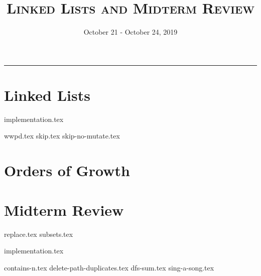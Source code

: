 \documentclass{exam}
\title{\textsc{Linked Lists and Midterm Review}}
\date{October 21 - October 24, 2019}
\begin{document}
\maketitle
\rule{\textwidth}{0.15em}
\fontsize{12}{15}\selectfont

\section{Linked Lists}
{implementation.tex}
\newpage
\begin{questions}
{wwpd.tex}
\newpage
{skip.tex}
{skip-no-mutate.tex}
\end{questions}

\section{Orders of Growth}
\begin{questions}


\end{questions}

\section{Midterm Review}
\begin{questions}
{replace.tex}
{subsets.tex}
\end{questions}
\newpage
{implementation.tex}
\vspace{\baselineskip}
\begin{questions}
{contains-n.tex}
{delete-path-duplicates.tex}
\newpage
{dfs-sum.tex}
{sing-a-song.tex}

\end{questions}
\end{document}
